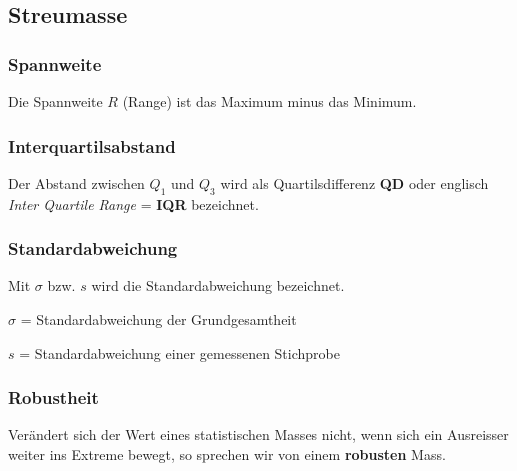 \begin{multicols}{2}
\subsection*{Streumasse}
\subsubsection*{Spannweite}
Die Spannweite $R$ (Range) ist das Maximum minus
das Minimum.

\subsubsection*{Interquartilsabstand}
Der Abstand zwischen $Q_1$ und $Q_3$ wird als
Quartilsdifferenz \textbf{QD} oder
englisch \textit{Inter Quartile Range} = \textbf{IQR} bezeichnet.

\subsubsection*{Standardabweichung}
Mit $\sigma$ bzw. $s$ wird die Standardabweichung bezeichnet.

$\sigma$ = Standardabweichung der Grundgesamtheit

$s$ = Standardabweichung einer gemessenen Stichprobe


\subsubsection*{Robustheit}
Verändert sich der Wert eines statistischen Masses nicht, wenn sich ein Ausreisser
weiter ins Extreme bewegt, so sprechen wir von einem \textbf{robusten} Mass.

%


%
%
\forceCB%

\end{multicols}
